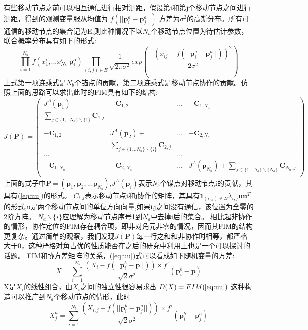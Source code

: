 \documentclass[12pt]{article}
\begin{document}
有些移动节点之前可以相互通信进行相对测距，假设第i和第j个移动节点之间进行测距，得到的观测变量服从均值为
$f(||\bm{p}^a_i-\bm{p}^a_j||)$
方差为$\sigma^2$的高斯分布。所有可通信的移动节点的集合记为E,则此种情况下以$N_a$个移动节点位置为待估计参数，联合概率分布具有如下的形式:
\begin{equation}
\prod_{i=1}^{N_a} f(x^i_1,...x^{i}_{N_b}|\bm{p^a_i})\prod_{(i,j)\in E}\frac{1}{\sqrt{2\pi\sigma^2}}exp(-\frac{(x_{ij}-f(||\bm{p}^a_i-\bm{p}^a_j||))^2}{2\sigma^2})
\end{equation}
上式第一项连乘式是$N_b$个锚点的贡献，第二项连乘式是移动节点协作的贡献。仿照上面的思路可以求出此时的FIM具有如下的结构:
\begin{equation}
J(\bm{P})=
\left(
\begin{array}{cccc}
J^A(\bm{p}_1)+&-\bm{C}_{1,2}&...&-\bm{C}_{1,N_a}\\
\sum_{j\in \{1,..N_a\}\backslash\{1\}}\bm{C}_{1,j}&&&\\
&&&\\
-\bm{C}_{1,2} & J^A(\bm{p}_2)+
&...&-\bm{C}_{2,N_a}\\
&\sum_{j\in \{1,..N_a\}\backslash \{2\}}\bm{C}_{2,j}&&\\
...&&...&\\
-\bm{C}_{1,N_a}&-\bm{C}_{2,N_a}&...& J^A(\bm{p}_{N_a})+\sum_{j\in \{1,..N_a\}\backslash\{N_a\}}\bm{C}_{N_a,j}\\
\end{array}
\right)
\end{equation}
上面的式子中$\bm{P}=(\bm{p}_1,\bm{p}_2,...\bm{p}_{N_a})$,$J^A(\bm{p}_i)$表示$N_b$个锚点对移动节点i的贡献，其具有(\ref{eq:uu})的形式。
$C_{i,j}$表示移动节点i和j协作的矩阵，其具有$\bm{1}_{(i,j)\in E}\lambda_{i,j}\bm{u}\bm{u}^T$的形式,u是两个移动节点间的单位方向向量,如果i,j之间没有通信，该位置为全零的2阶方阵。
$N_a \backslash \{i\}$应理解为移动节点序号1到$N_a$中去掉i后的集合。
相比起非协作的情形，协作定位的FIM存在耦合项，即非对角元非零的情况，因而其FIM的结构更复杂。通过简单的观察，我们发现$J(\bm{P})$每一行之和和非协作时相等，都严格大于0，这种严格对角占优的性质能否在之后的研究中利用上也是一个可以探讨的话题。
FIM和协方差矩阵的关系，(\ref{eq:uu})式可以看成如下随机变量的方差:
\begin{equation}
X=\sum_{i=1}^{N_b} \frac{(X_i-f(||\bm{p}^b_i-\bm{p}||))\times f'}{\sqrt{2}\sigma^2}(\bm{p}^b_i-\bm{p})
\end{equation}
X是$X_i$的线性组合，由$X_i$之间的独立性很容易求出
$D(X)=FIM(\ref{eq:uu})$
这种构造可以推广到$N_a$个移动节点的情形，此时
\begin{equation}
X^a_j=\sum_{i=1}^{N_b} \frac{(X_{i,j}-f(||\bm{p}^b_i-\bm{p}^a_j||))\times f'}{\sqrt{2}\sigma^2}(\bm{p}^b_i-\bm{p}^a_j)
\end{equation}
\end{document}
